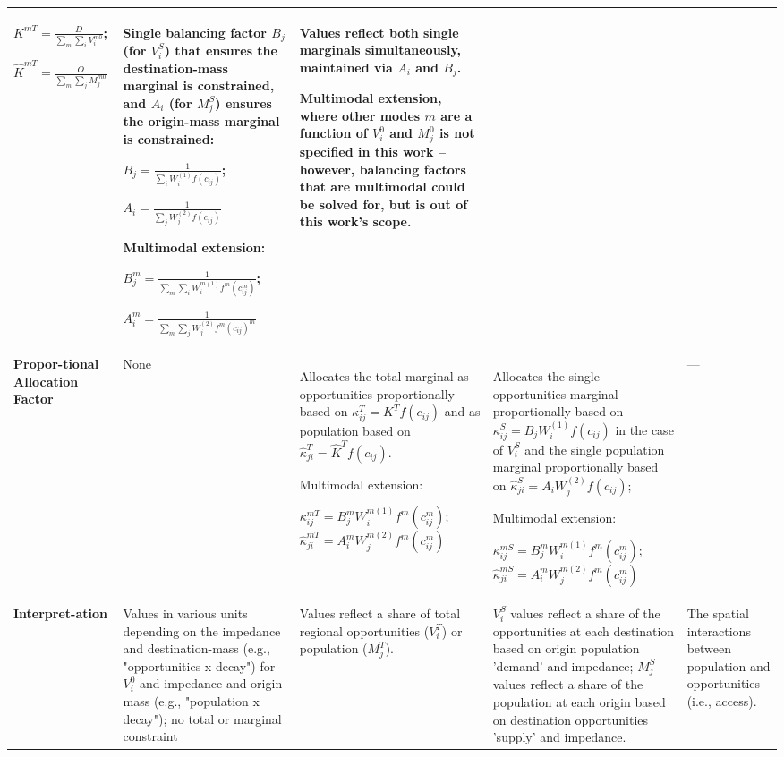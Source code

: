 {\begin{longtable}{|p{1.2cm}|p{2cm}|p{3.8cm}|p{3.7cm}|p{2cm}|}
$K^{mT} = \frac{D}{\sum_m\sum_i V_i^{m0}}$;

$\hat{K}^{mT} = \frac{O}{\sum_m\sum_j M_j^{m0}}$ 
&
Single balancing factor $B_j$ (for $V_i^S$) that ensures the destination-mass marginal is constrained, and $A_i$ (for $M_j^S$) ensures the origin-mass marginal is constrained:

$B_j = \frac{1}{\sum_i W_i^{(1)} f(c_{ij})}$;

$A_i = \frac{1}{\sum_j W_j^{(2)} f(c_{ij})}$ 

Multimodal extension:

$B_j^m = \frac{1}{\sum_m\sum_i W_i^{m(1)} f^m(c_{ij}^m)}$;

$A_i^m = \frac{1}{\sum_m\sum_j W_j^{(2)} f^m(c_{ij})^m}$ 
&
Values reflect both single marginals simultaneously, maintained via $A_i$ and $B_j$. 

Multimodal extension, where other modes $m$ are a function of $V_i^0$ and $M_j^0$ is not specified in this work -- however, balancing factors that are multimodal could be solved for, but is out of this work's scope. \\
\hline

\textbf{Propor-tional Allocation Factor} &
None &
Allocates the total marginal as opportunities proportionally based on $\kappa_{ij}^T = K^T f(c_{ij})$ and as population based on  $\hat{\kappa}_{ji}^T = \hat K^T f(c_{ij})$.

Multimodal extension:

$\kappa_{ij}^{mT} = B_j^m W_i^{m(1)} f^m(c_{ij}^m)$;
$\hat{\kappa}_{ji}^{mT} = A_i^m W_j^{m(2)} f^m(c_{ij}^m)$ 

&
Allocates the single opportunities marginal proportionally based on $\kappa^S_{ij} = B_j W_i^{(1)} f(c_{ij}) $ in the case of $V_i^S$ and the single population marginal proportionally based on $\hat \kappa^S_{ji} = A_i W_j^{(2)} f(c_{ij})$;

Multimodal extension:

$\kappa_{ij}^{mS} = B_j^m W_i^{m(1)} f^m(c_{ij}^m)$;
$\hat{\kappa}_{ji}^{mS} = A_i^m W_j^{m(2)} f^m(c_{ij}^m)$ 

&
— \\
\hline

\textbf{Interpret-ation} &
Values in various units depending on the impedance and destination-mass (e.g., "opportunities x decay") for $V_i^0$ and impedance and origin-mass (e.g., "population x decay"); no total or marginal constraint &
Values reflect a share of total regional opportunities ($V^T_i$) or population ($M^T_j$). &
$V^S_i$ values reflect a share of the opportunities at each destination based on origin population 'demand' and impedance; $M^S_j$ values reflect a share of the population at each origin based on destination opportunities 'supply' and impedance. &
The spatial interactions between population and opportunities (i.e., access). \\
\hline

\end{longtable}
}
